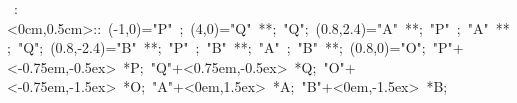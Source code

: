 %

\hbox{
\xy    <1cm,0cm>:<0cm,0.5cm>::
       (-1,0)="P" ; (4,0)="Q" **\dir{-};
       "Q"; (0.8,2.4)="A" **\dir{-};  
       "P" ; "A" **\dir{-};   
       "Q"; (0.8,-2.4)="B" **\dir{-};  
       "P" ; "B" **\dir{-};   
       "A" ; "B" **\dir{-}; (0.8,0)="O";  
       "P"+<-0.75em,-0.5ex> *{P};
       "Q"+<0.75em,-0.5ex> *{Q};
       "O"+<-0.75em,-1.5ex> *{O};
       "A"+<0em,1.5ex> *{A};
       "B"+<0em,-1.5ex> *{B};
       \endxy}
	   

